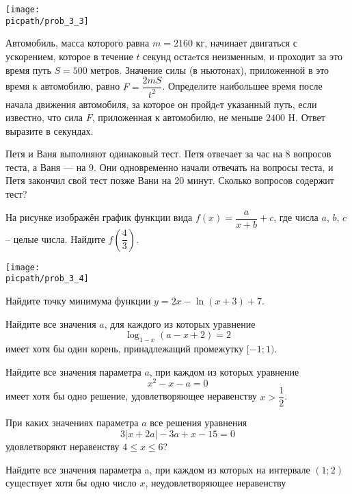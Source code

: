 \begin{class}[number=3]
\begin{listofex}
\begin{minipage}[t]{\bodywidth}
			\foranswer
		\end{minipage}
		\gapwidth
		\begin{minipage}[t]{\picwidth}
			\texttt{[image: \\picpath/prob\_3\_3]}
		\end{minipage}
	\item Автомобиль, масса которого равна \( m=2160 \) кг, начинает двигаться с ускорением, которое в
	течение \( t \) секунд остаeтся неизменным, и проходит за это время путь \( S=500 \) метров. Значение силы
	(в ньютонах), приложенной в это время к автомобилю, равно \( F=\dfrac{2mS}{t^2} \). Определите наибольшее
	время после начала движения автомобиля, за которое он пройдeт указанный путь, если известно, что
	сила \( F \), приложенная к автомобилю, не меньше \( 2400 \) H. Ответ выразите в секундах.
	\foranswer
	\item Петя и Ваня выполняют одинаковый тест. Петя отвечает за час на 8 вопросов теста, а Ваня —
	на 9. Они одновременно начали отвечать на вопросы теста, и Петя закончил свой тест позже Вани на
	20 минут. Сколько вопросов содержит тест?
	\foranswer
	\item
	\begin{minipage}[t]{\bodywidth}
		На рисунке изображён график функции вида \( f(x)=\dfrac{a}{x+b}+c \), где числа \( a \), \( b \), \( c \) -- целые числа. Найдите \( f\left( \dfrac{4}{3} \right) \).
		\foranswer
	\end{minipage}
	\gapwidth
	\begin{minipage}[t]{\picwidth}
		\texttt{[image: \\picpath/prob\_3\_4]}
	\end{minipage}
	\item Найдите точку минимума функции \( y=2x-\ln(x+3)+7 \).
	\foranswer
	\item Найдите все значения \( a \), для каждого из которых уравнение \[ \log_{1-x}(a-x+2)=2 \] имеет хотя бы один корень, принадлежащий промежутку \( [-1;1) \).
	\end{listofex}
	\newpage
	\begin{listofex}
	\item Найдите все значения параметра \( a \), при каждом из которых уравнение
	\[ x^2-x-a=0 \]
	имеет хотя бы одно решение, удовлетворяющее неравенству \( x>\dfrac{1}{2} \).
	\item При каких значениях параметра \( a \) все решения уравнения
	\[ 3|x+2a|-3a+x-15=0 \]
	удовлетворяют неравенству \( 4\le x \le 6 \)?
	\item Найдите все значения параметра a, при каждом из которых на интервале \( (1;2) \) существует хотя бы одно число \( x \), неудовлетворяющее неравенству

\end{listofex}
\end{class}
